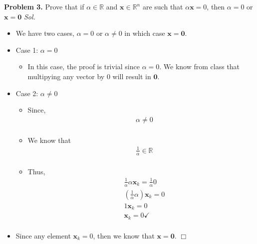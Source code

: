 \documentclass[11pt]{article}
\begin{document}
  \clearpage
  {\bf Problem 3.} 	Prove that if $\alpha \in \mathbb{R}$ and $\mathbf{x} \in \mathbb{R}^n$ are such that
  $\alpha \mathbf{x} = 0$, then $\alpha = 0$ or $\mathbf{x} = \mathbf{0}$
  \textit{ Sol. }
  \begin{itemize}
    \item[] We have two cases, $\alpha = 0$ or $\alpha \neq 0$ in which case $\mathbf{x} = \mathbf{0}$.
    \item[] Case 1: $\alpha = 0$ \begin{itemize}
        \item[] In this case, the proof is trivial since $\alpha = 0$. We know from class that
          multipying any vector by $0$ will result in $\mathbf{0}$.
      \end{itemize}
    \item[] Case 2: $\alpha \neq 0$ \begin{itemize}
        \item[] Since, \begin{align*} & \alpha \neq 0 \\ \end{align*}
      \item[] We know that \begin{align*}
        & \frac{1}{\alpha} \in \mathbb{R} \\
      \end{align*}
    \item[] Thus, \begin{align*}
        & \frac{1}{\alpha} \alpha \mathbf{x}_k = \frac{1}{\alpha} 0 \\
        & (\frac{1}{\alpha} \alpha) \mathbf{x}_k = 0 \\
        & 1 \mathbf{x}_k = 0 \\
        & \mathbf{x}_k = 0 \checkmark \\
      \end{align*}
      \end{itemize}
    \item[] Since any element $\mathbf{x}_k = 0$, then we know that $\mathbf{x} = \mathbf{0}$. $\Box$

      
	\end{itemize}
\end{document}
